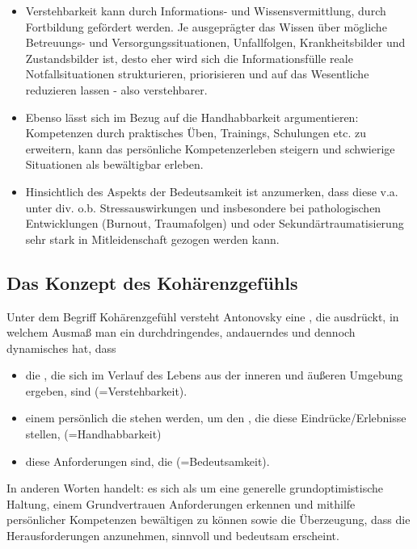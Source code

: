 {\begin{itemize}
  \item Verstehbarkeit kann durch Informations- und
  Wissensvermittlung, durch Fortbildung gefördert werden. Je
  ausgeprägter das Wissen über mögliche Betreuungs- und
  Versorgungssituationen, Unfallfolgen, Krankheitsbilder und
  Zustandsbilder ist, desto eher wird sich die
  Informationsfülle reale Notfallsituationen strukturieren,
  priorisieren und auf das Wesentliche reduzieren lassen -
  also verstehbarer.
  
  \item Ebenso lässt sich im Bezug auf die Handhabbarkeit
  argumentieren: Kompetenzen durch praktisches Üben,
  Trainings, Schulungen etc. zu erweitern, kann das
  persönliche Kompetenzerleben steigern und schwierige
  Situationen als bewältigbar erleben.
  
  \item Hinsichtlich des Aspekts der Bedeutsamkeit ist
  anzumerken, dass diese v.a. unter div. o.b.
  Stressauswirkungen und insbesondere bei pathologischen
  Entwicklungen (Burnout, Traumafolgen) und oder
  Sekundärtraumatisierung sehr stark in Mitleidenschaft
  gezogen werden kann.
\end{itemize}
}

\subsection{Das Konzept des Kohärenzgefühls}

Unter dem Begriff Kohärenzgefühl versteht Antonovsky eine
, die ausdrückt, in welchem Ausmaß
man ein durchdringendes, andauerndes und dennoch dynamisches
 hat, dass
\begin{itemize}
  \item die , die sich im Verlauf des Lebens aus
  der inneren und äußeren Umgebung ergeben,  sind (=Verstehbarkeit).
  \item einem persönlich die  stehen werden,
  um den , die diese Eindrücke/Erlebnisse stellen,  (=Handhabbarkeit)
  \item diese Anforderungen  sind, die
   (=Bedeutsamkeit).
\end{itemize}
In anderen Worten handelt: es sich als um eine
generelle grundoptimistische Haltung, einem Grundvertrauen Anforderungen erkennen und mithilfe persönlicher Kompetenzen bewältigen zu können sowie die Überzeugung, dass die Herausforderungen anzunehmen, sinnvoll und bedeutsam erscheint. 

